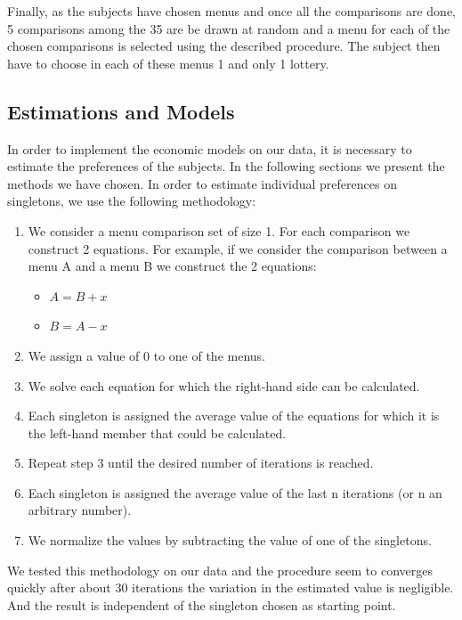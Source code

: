 \documentclass[
]{book}
\providecommand{\tightlist}{%
  \setlength{\itemsep}{0pt}\setlength{\parskip}{0pt}}
\begin{document}
Finally, as the subjects have chosen menus and once all the comparisons are
done, 5 comparisons among the 35 are be drawn at random and a menu for each of
the chosen comparisons is selected using the described procedure.
The subject then have to choose in each of these menus 1 and only 1 lottery.

\hypertarget{estimations-and-models}{%
\subsection{Estimations and Models}\label{estimations-and-models}}

In order to implement the economic models on our data, it is necessary to
estimate the preferences of the subjects. In the following sections we present
the methods we have chosen.
In order to estimate individual preferences on singletons, we use the following
methodology:

\begin{enumerate}
\def\labelenumi{\arabic{enumi}.}
\tightlist
\item
  We consider a menu comparison set of size 1.
  For each comparison we construct 2 equations.
  For example, if we consider the comparison between a menu A and a menu B we
  construct the 2 equations:

  \begin{itemize}
  \tightlist
  \item
    \(A = B + x\)
  \item
    \(B = A - x\)
  \end{itemize}
\item
  We assign a value of 0 to one of the menus.
\item
  We solve each equation for which the right-hand side can be calculated.
\item
  Each singleton is assigned the average value of the equations for which it is
  the left-hand member that could be calculated.
\item
  Repeat step 3 until the desired number of iterations is reached.
\item
  Each singleton is assigned the average value of the last n iterations (or n
  an arbitrary number).
\item
  We normalize the values by subtracting the value of one of the singletons.
\end{enumerate}

We tested this methodology on our data and the procedure seem to converges
quickly after about 30 iterations the variation in the estimated value is
negligible.
And the result is independent of the singleton chosen as starting point.
\end{document}
